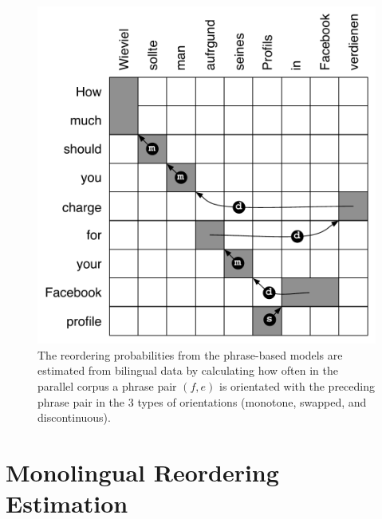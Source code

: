 \documentclass[11pt,letterpaper]{article}
\begin{document}
\begin{figure}[t]
\begin{center}
\includegraphics[width=0.8 \linewidth]{../figures/reorderfeats/reorderfeats.pdf}
\caption{The reordering probabilities from the phrase-based models are estimated from bilingual data by calculating how often in the parallel corpus a phrase pair $(f, e)$ is orientated with the preceding phrase pair in the 3 types of orientations (monotone, swapped, and discontinuous). }
\label{fig:reorderfeats} 
\end{center}
\end{figure}

\section{Monolingual Reordering Estimation} \label{sect:order}

\end{document}
